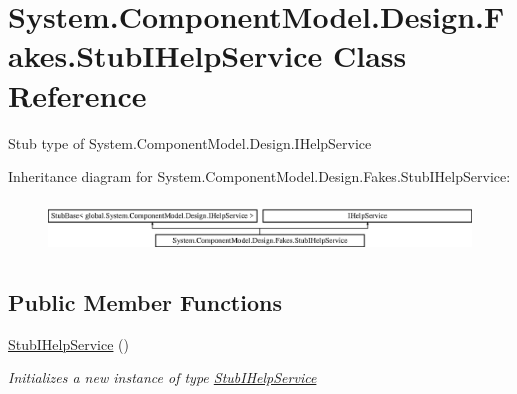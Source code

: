 \hypertarget{class_system_1_1_component_model_1_1_design_1_1_fakes_1_1_stub_i_help_service}{\section{System.\-Component\-Model.\-Design.\-Fakes.\-Stub\-I\-Help\-Service Class Reference}
\label{class_system_1_1_component_model_1_1_design_1_1_fakes_1_1_stub_i_help_service}
}


Stub type of System.\-Component\-Model.\-Design.\-I\-Help\-Service 


Inheritance diagram for System.\-Component\-Model.\-Design.\-Fakes.\-Stub\-I\-Help\-Service\-:\begin{figure}[H]
\begin{center}
\leavevmode
\includegraphics[height=1.410579cm]{class_system_1_1_component_model_1_1_design_1_1_fakes_1_1_stub_i_help_service}
\end{center}
\end{figure}
\subsection*{Public Member Functions}
\begin{DoxyCompactItemize}
\item 
\hyperlink{class_system_1_1_component_model_1_1_design_1_1_fakes_1_1_stub_i_help_service_a4062ed8bc8b861682da4ff1ebdef156e}{Stub\-I\-Help\-Service} ()
\begin{DoxyCompactList}\small\item\em Initializes a new instance of type \hyperlink{class_system_1_1_component_model_1_1_design_1_1_fakes_1_1_stub_i_help_service}{Stub\-I\-Help\-Service}\end{DoxyCompactList}\end{DoxyCompactItemize}
